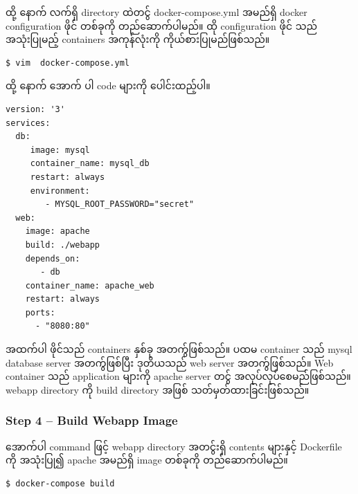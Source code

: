 ထို့ နောက် လက်ရှိ directory ထဲတင်ွ docker-compose.yml အမည်ရှိ docker
configuration ဖိုင် တစ်ခုကို တည်ဆောက်ပါမည်။ ထို configuration ဖိုင် သည်
အသုံးပြုမည့် containers အကုန်လုံးကို ကိုယ်စားပြုမည်ဖြစ်သည်။

\begin{verbatim}
$ vim  docker-compose.yml
\end{verbatim}

ထို့ နောက် အောက် ပါ code များကို ပေါင်းထည့်ပါ။

\begin{verbatim}
version: '3'
services:
  db:
     image: mysql
     container_name: mysql_db
     restart: always
     environment:
        - MYSQL_ROOT_PASSWORD="secret"
  web:
    image: apache
    build: ./webapp
    depends_on:
       - db
    container_name: apache_web
    restart: always
    ports:
      - "8080:80"
\end{verbatim}

အထက်ပါ ဖိုင်သည် containers နှစ်ခု အတက်ွဖြစ်သည်။ ပထမ container သည် mysql
database server အတက်ွဖြစ်ပြီး ဒုတိယသည် web server အတက်ွဖြစ်သည်။ Web
container သည် application များကို apache server တင်ွ
အလုပ်လုပ်စေမည်ဖြစ်သည်။ webapp directory ကို build directory အဖြစ်
သတ်မှတ်ထားခြင်းဖြစ်သည်။

\subsubsection{Step 4 -- Build Webapp
Image}\label{step-4-build-webapp-image}

အောက်ပါ command ဖြင့် webapp directory အတင်ွးရှိ contents များနှင့်
Dockerfile ကို အသုံးပြု၍ apache အမည်ရှိ image တစ်ခုကို တည်ဆောက်ပါမည်။

\begin{verbatim}
$ docker-compose build
\end{verbatim}

